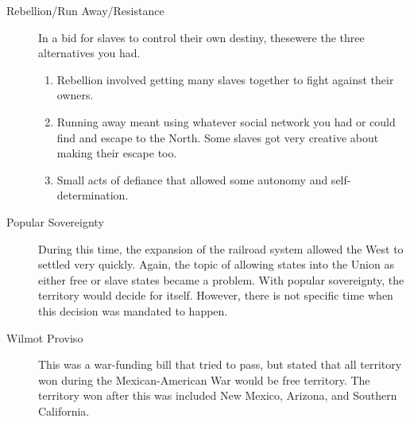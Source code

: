 \begin{description}
\item[Rebellion/Run Away/Resistance] In a bid for slaves to control their own destiny, thesewere the three alternatives you had.
  \begin{enumerate}[noitemsep]
  \item Rebellion involved getting many slaves together to fight against their owners.
  \item Running away meant using whatever social network you had or could find and escape to the North.
    Some slaves got very creative about making their escape too.
  \item Small acts of defiance that allowed some autonomy and self-determination.
  \end{enumerate}

\item[Popular Sovereignty] During this time, the expansion of the railroad system allowed the West to settled very quickly.
  Again, the topic of allowing states into the Union as either free or slave states became a problem.
  With popular sovereignty, the territory would decide for itself.
  However, there is not specific time when this decision was mandated to happen.

\item[Wilmot Proviso] This was a war-funding bill that tried to pass, but stated that all territory won during the Mexican-American War would be free territory.
  The territory won after this was included New Mexico, Arizona, and Southern California.


\end{description}
